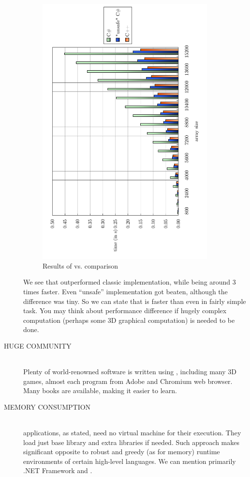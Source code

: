 \begin{description}
\begin{figure}[ht]
\centering\includegraphics[width=9cm,angle=-90]{graphics/laboratory/00-langcomparison.pdf}
\caption{Results of \cpp vs. \csharp comparison}\label{figure:comparison}
\end{figure}

We see that \cpp outperformed classic \csharp implementation, while being a\-round 3 times faster. Even \enquote{unsafe} \csharp implementation got beaten, although the difference was tiny. So we can state that \cpp is faster than \csharp even in fairly simple task. You may think about performance difference if hugely complex computation (perhaps some 3D graphical computation) is needed to be done.

\item[HUGE COMMUNITY\ts{\textcolor{YellowOrange}{great}}]\hfill \\
Plenty of world-renowned software is written using \cpp{}, including many 3D games, almost each program from Adobe and Chromium web browser. Many \cpp books are available, making it easier to learn.

\item[MEMORY CONSUMPTION\ts{\textcolor{ultragreen}{good}}]\hfill \\
\cpp applications, as stated, need no virtual machine for their execution. They load just base \cpp library and extra libraries if needed. Such approach makes significant opposite to robust and greedy (as for memory) runtime environments of certain high-level languages. We can mention primarily .NET Framework and .


\end{description}

